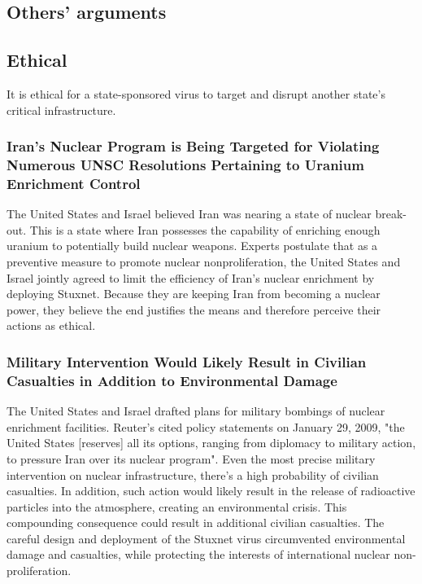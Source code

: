 \documentclass[12pt]{article}
\begin{document}
\begin{multicols}{2}
\section{Others' arguments}

\subsection{Ethical}

It is ethical for a state-sponsored virus to target and disrupt another state's critical infrastructure.

\subsubsection{Iran's Nuclear Program is Being Targeted for Violating Numerous UNSC Resolutions Pertaining to Uranium Enrichment Control}

The United States and Israel believed Iran was nearing a state of nuclear break-out. This is a state where Iran possesses the capability of enriching enough uranium to potentially build nuclear weapons. Experts postulate that as a preventive measure to promote nuclear nonproliferation, the United States and Israel jointly agreed to limit the eﬃciency of Iran’s nuclear enrichment by deploying Stuxnet.\cite{theRealStoryOfStuxnet}  Because they are keeping Iran from becoming a nuclear power, they believe the end justifies the means and therefore perceive their actions as ethical.

\subsubsection{Military Intervention Would Likely Result in Civilian Casualties in Addition to Environmental Damage}

The United States and Israel drafted plans for military bombings of nuclear enrichment facilities. Reuter's cited policy statements on January 29, 2009, "the United States [reserves] all its options, ranging from diplomacy to military action, to pressure Iran over its nuclear program".\cite{usOptionsForIran} Even the most precise military intervention on nuclear infrastructure, there's a high probability of civilian casualties. In addition, such action would likely result in the release of radioactive particles into the atmosphere, creating an environmental crisis. This compounding consequence could result in additional civilian casualties. The careful design and deployment of the Stuxnet virus circumvented environmental damage and casualties, while protecting the interests of international nuclear non-proliferation.


\end{multicols}
\end{document}
